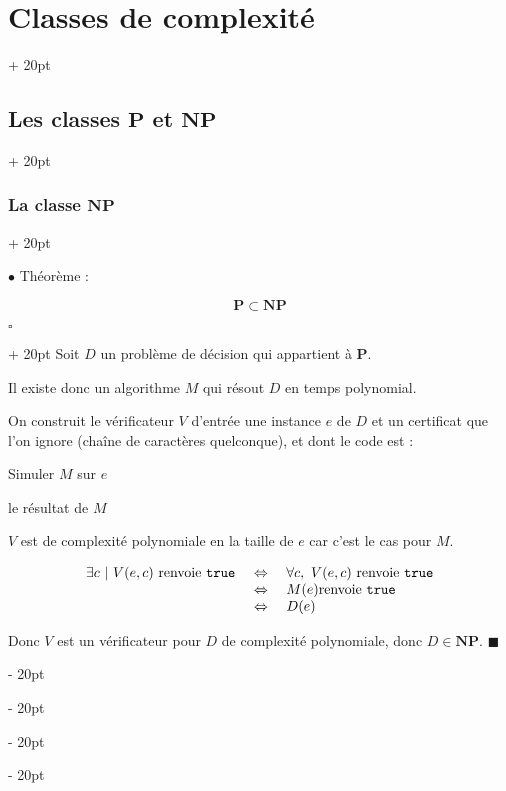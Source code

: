 \documentclass[a4paper, 12pt, twoside]{article}
\newenvironment{indalgo}[2][H]{
    \begin{algoBox}
        \begin{algorithm}[#1]
            \caption{#2}
}
{
        \end{algorithm}
    \end{algoBox}
}
\newcommand{\ssi}{\ \Leftrightarrow \ }
\newcommand{\ind}[1][20pt]{\advance\leftskip + #1}
\newcommand{\deind}[1][20pt]{\advance\leftskip - #1}
\newenvironment{indt}[2][20pt]{#2 \par \ind[#1]}{\par \deind} %
\newenvironment{proof}[1][{}]{\begin{indt}{$\square$ #1}}{$\blacksquare$ \end{indt}}
\begin{document}
\begin{indt}{\section{Classes de complexité}}
\begin{indt}{\subsection{Les classes $\mathbf P$ et $\mathbf{NP}$}}
\begin{indt}{\subsubsection{La classe $\mathbf{NP}$}}
                \vspace{12pt}
                
                $\bullet$ Théorème :
                \begin{emphBox}
                    \[
                        \mathbf P \subset \mathbf{NP}
                    \]
                \end{emphBox}

                \vspace{6pt}
                
                \begin{proof}
                    Soit $D$ un problème de décision qui appartient à $\mathbf P$.

                    Il existe donc un algorithme $M$ qui résout $D$ en temps polynomial.

                    On construit le vérificateur $V$ d'entrée une instance $e$ de $D$ et un certificat que l'on ignore (chaîne de caractères quelconque), et dont le code est :

                    \begin{indalgo}{$V$}

                        \BlankLine

                        Simuler $M$ sur $e$\;

                        \Return le résultat de $M$\;
                    \end{indalgo}

                    $V$ est de complexité polynomiale en la taille de $e$ car c'est le cas pour $M$.

                    \[
                        \begin{array}{rcl}
                            \exists c\ |\ V(e, c)\ \text{renvoie \texttt{true}}
                            &\ssi&
                            \forall c,\ V(e, c)\ \text{renvoie \texttt{true}}
                            \\
                            &\ssi& M(e) \text{renvoie \texttt{true}}
                            \\
                            &\ssi& D(e)
                        \end{array}
                    \]

                    Donc $V$ est un vérificateur pour $D$ de complexité polynomiale, donc $D \in \mathbf{NP}$.
                \end{proof}


\end{indt}
\end{indt}
\end{indt}
\end{document}
